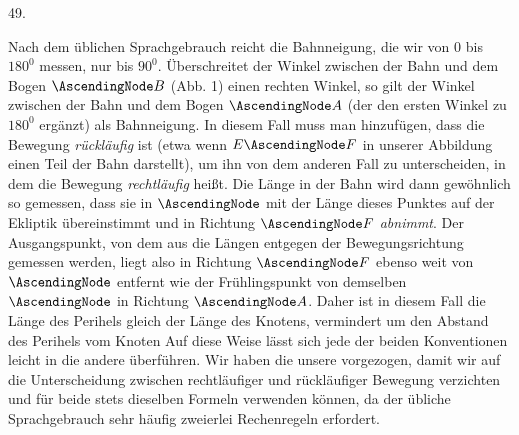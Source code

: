\par{}
\begin{center}
\hypertarget{native-067-article049}{}49.
\end{center}
Nach dem üblichen Sprachgebrauch reicht die Bahnneigung, die wir von $0$ bis $180^0$ messen, nur bis $90^0$. Überschreitet der Winkel zwischen der Bahn und dem Bogen $\AscendingNode B$ (Abb. 1) einen rechten Winkel, so gilt der Winkel zwischen der Bahn und dem Bogen $\AscendingNode A$ (der den ersten Winkel zu $180^0$ ergänzt) als Bahnneigung. In diesem Fall muss man hinzufügen, dass die Bewegung \emph{rückläufig} ist (etwa wenn $E\AscendingNode F$ in unserer Abbildung einen Teil der Bahn darstellt), um ihn von dem anderen Fall zu unterscheiden, in dem die Bewegung \emph{rechtläufig} heißt. Die Länge in der Bahn wird dann gewöhnlich so gemessen, dass sie in $\AscendingNode$ mit der Länge dieses Punktes auf der Ekliptik übereinstimmt und in Richtung $\AscendingNode F$ \emph{abnimmt}. Der Ausgangspunkt, von dem aus die Längen entgegen der Bewegungsrichtung gemessen werden, liegt also in Richtung $\AscendingNode F$ ebenso weit von $\AscendingNode$ entfernt wie der Frühlingspunkt von demselben $\AscendingNode$ in Richtung $\AscendingNode A$. Daher ist in diesem Fall die Länge des Perihels gleich der Länge des Knotens, vermindert um den Abstand des Perihels vom Knoten Auf diese Weise lässt sich jede der beiden Konventionen leicht in die andere überführen. Wir haben die unsere vorgezogen, damit wir auf die Unterscheidung zwischen rechtläufiger und rückläufiger Bewegung verzichten und für beide stets dieselben Formeln verwenden können, da der übliche Sprachgebrauch sehr häufig zweierlei Rechenregeln erfordert.
